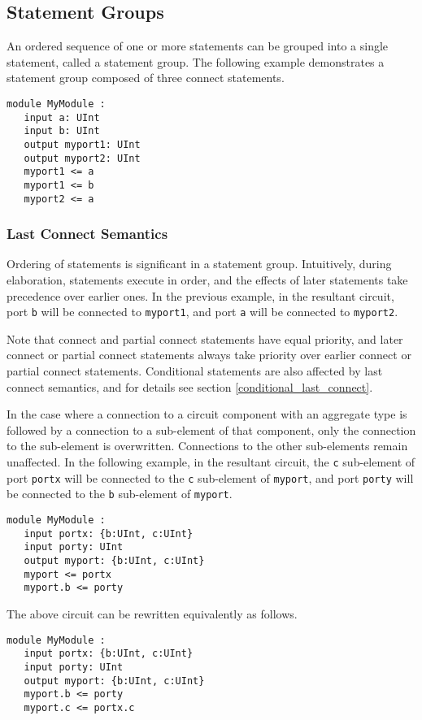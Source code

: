 \documentclass[12pt]{article}
\begin{document}
\subsection{Statement Groups} \label{statement_groups}

An ordered sequence of one or more statements can be grouped into a single statement, called a statement group. The following example demonstrates a statement group composed of three connect statements.

\begin{lstlisting}
module MyModule :
   input a: UInt
   input b: UInt
   output myport1: UInt
   output myport2: UInt
   myport1 <= a
   myport1 <= b
   myport2 <= a
\end{lstlisting}

\subsubsection{Last Connect Semantics}\label{last_connect}
Ordering of statements is significant in a statement group. Intuitively, during elaboration, statements execute in order, and the effects of later statements take precedence over earlier ones. In the previous example, in the resultant circuit, port \verb|b| will be connected to \verb|myport1|, and port \verb|a| will be connected to \verb|myport2|.

Note that connect and partial connect statements have equal priority, and later connect or partial connect statements always take priority over earlier connect or partial connect statements. Conditional statements are also affected by last connect semantics, and for details see section \ref{conditional_last_connect}.

In the case where a connection to a circuit component with an aggregate type is followed by a connection to a sub-element of that component, only the connection to the sub-element is overwritten. Connections to the other sub-elements remain unaffected. In the following example, in the resultant circuit, the \verb|c| sub-element of port \verb|portx| will be connected to the \verb|c| sub-element of \verb|myport|, and port \verb|porty| will be connected to the \verb|b| sub-element of \verb|myport|.
\begin{lstlisting}
module MyModule :
   input portx: {b:UInt, c:UInt}
   input porty: UInt
   output myport: {b:UInt, c:UInt}
   myport <= portx
   myport.b <= porty
\end{lstlisting}
The above circuit can be rewritten equivalently as follows.
\begin{lstlisting}
module MyModule :
   input portx: {b:UInt, c:UInt}
   input porty: UInt
   output myport: {b:UInt, c:UInt}
   myport.b <= porty
   myport.c <= portx.c
\end{lstlisting}
\end{document}
